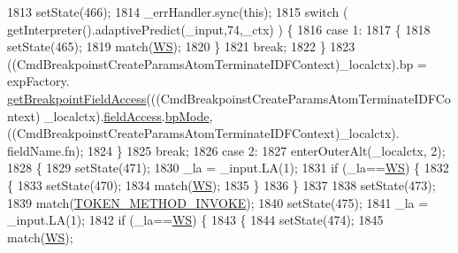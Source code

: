 \begin{DoxyCode}
1813         setState(466);
1814         \_errHandler.sync(\textcolor{keyword}{this});
1815         \textcolor{keywordflow}{switch} ( getInterpreter().adaptivePredict(\_input,74,\_ctx) ) \{
1816         \textcolor{keywordflow}{case} 1:
1817           \{
1818           setState(465);
1819           match(\hyperlink{classgov_1_1nasa_1_1jpf_1_1inspector_1_1server_1_1expression_1_1parser_1_1_expression_grammar_parser_ace44714ae633c7b14794cc5a24d9ebf3}{WS});
1820           \}
1821           \textcolor{keywordflow}{break};
1822         \}
1823          ((CmdBreakpoinstCreateParamsAtomTerminateIDFContext)\_localctx).bp =  expFactory.
      \hyperlink{classgov_1_1nasa_1_1jpf_1_1inspector_1_1server_1_1expression_1_1_expression_factory_a8350a5faaa964db6cf819dc7a458dd90}{getBreakpointFieldAccess}(((CmdBreakpoinstCreateParamsAtomTerminateIDFContext)
      \_localctx).\hyperlink{classgov_1_1nasa_1_1jpf_1_1inspector_1_1server_1_1expression_1_1parser_1_1_expression_grammar_parser_ab65b047e852d9f4863e316728b4e791a}{fieldAccess}.\hyperlink{classgov_1_1nasa_1_1jpf_1_1inspector_1_1server_1_1expression_1_1parser_1_1_expression_grammar_parser_1_1_field_access_context_aae257159483b52a02404cc18b49b69b3}{bpMode}, ((CmdBreakpoinstCreateParamsAtomTerminateIDFContext)\_localctx).
      fieldName.fn); 
1824         \}
1825         \textcolor{keywordflow}{break};
1826       \textcolor{keywordflow}{case} 2:
1827         enterOuterAlt(\_localctx, 2);
1828         \{
1829         setState(471);
1830         \_la = \_input.LA(1);
1831         \textcolor{keywordflow}{if} (\_la==\hyperlink{classgov_1_1nasa_1_1jpf_1_1inspector_1_1server_1_1expression_1_1parser_1_1_expression_grammar_parser_ace44714ae633c7b14794cc5a24d9ebf3}{WS}) \{
1832           \{
1833           setState(470);
1834           match(\hyperlink{classgov_1_1nasa_1_1jpf_1_1inspector_1_1server_1_1expression_1_1parser_1_1_expression_grammar_parser_ace44714ae633c7b14794cc5a24d9ebf3}{WS});
1835           \}
1836         \}
1837 
1838         setState(473);
1839         match(\hyperlink{classgov_1_1nasa_1_1jpf_1_1inspector_1_1server_1_1expression_1_1parser_1_1_expression_grammar_parser_a63bec4a39b74ca614759bfbd21877369}{TOKEN\_METHOD\_INVOKE});
1840         setState(475);
1841         \_la = \_input.LA(1);
1842         \textcolor{keywordflow}{if} (\_la==\hyperlink{classgov_1_1nasa_1_1jpf_1_1inspector_1_1server_1_1expression_1_1parser_1_1_expression_grammar_parser_ace44714ae633c7b14794cc5a24d9ebf3}{WS}) \{
1843           \{
1844           setState(474);
1845           match(\hyperlink{classgov_1_1nasa_1_1jpf_1_1inspector_1_1server_1_1expression_1_1parser_1_1_expression_grammar_parser_ace44714ae633c7b14794cc5a24d9ebf3}{WS});

\end{DoxyCode}
